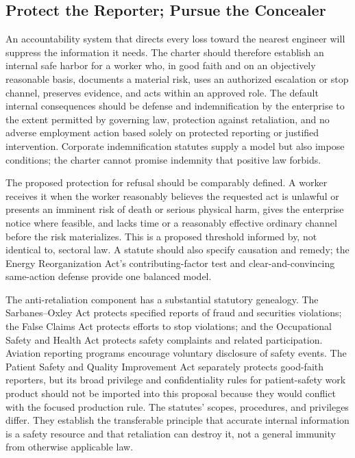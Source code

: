 \subsection{Protect the Reporter; Pursue the Concealer}

An accountability system that directs every loss toward the nearest engineer will suppress the information it needs. The charter should therefore establish an internal safe harbor for a worker who, in good faith and on an objectively reasonable basis, documents a material risk, uses an authorized escalation or stop channel, preserves evidence, and acts within an approved role. The default internal consequences should be defense and indemnification by the enterprise to the extent permitted by governing law, protection against retaliation, and no adverse employment action based solely on protected reporting or justified intervention. Corporate indemnification statutes supply a model but also impose conditions; the charter cannot promise indemnity that positive law forbids.

The proposed protection for refusal should be comparably defined. A worker receives it when the worker reasonably believes the requested act is unlawful or presents an imminent risk of death or serious physical harm, gives the enterprise notice where feasible, and lacks time or a reasonably effective ordinary channel before the risk materializes. This is a proposed threshold informed by, not identical to, sectoral law. A statute should also specify causation and remedy; the Energy Reorganization Act's contributing-factor test and clear-and-convincing same-action defense provide one balanced model.

The anti-retaliation component has a substantial statutory genealogy. The Sarbanes--Oxley Act protects specified reports of fraud and securities violations; the False Claims Act protects efforts to stop violations; and the Occupational Safety and Health Act protects safety complaints and related participation. Aviation reporting programs encourage voluntary disclosure of safety events. The Patient Safety and Quality Improvement Act separately protects good-faith reporters, but its broad privilege and confidentiality rules for patient-safety work product should not be imported into this proposal because they would conflict with the focused production rule. The statutes' scopes, procedures, and privileges differ. They establish the transferable principle that accurate internal information is a safety resource and that retaliation can destroy it, not a general immunity from otherwise applicable law.


